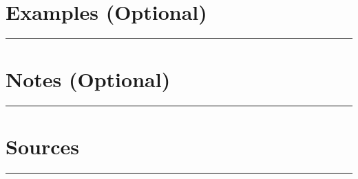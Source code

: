 \documentclass[11pt]{article}
\begin{document}
\vspace{4em}

\section*{Examples (Optional)}
\noindent\rule{0.72\linewidth}{0.4pt}

\vspace{8em}

\section*{Notes (Optional)}
\noindent\rule{0.72\linewidth}{0.4pt}

\vspace{6em}

\section*{Sources}
\noindent\rule{0.72\linewidth}{0.4pt}

\vspace{6em}
\end{document}
